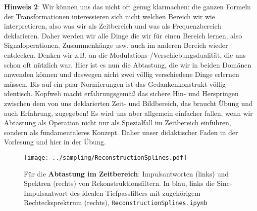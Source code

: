 \textbf{Hinweis 2}: Wir können uns das nicht oft genug klarmachen: die ganzen
Formeln der Transformationen interessieren sich nicht welchen Bereich wir wie
interpretieren,
also was wir als Zeitbereich und was als Frequenzbereich deklarieren. Daher werden
wir alle Dinge die wir für einen Bereich lernen, also Signaloperationen, Zusammenhänge usw.
auch im anderen Bereich wieder entdecken. Denken wir z.B.
an die Modulations-/Verschiebungsdualität,
die uns schon oft nützlich war.
Hier ist es nun die Abtastung, die wir in beiden Domänen anwenden können und
deswegen nicht zwei völlig verschiedene Dinge erlernen müssen. Bis auf ein
paar Normierungen ist das Gedankenkonstrukt völlig identisch. Kopfweh macht
erfahrungsgemäß das sichere Hin- und Herspringen zwischen dem von uns deklarierten
Zeit- und Bildbereich,
das braucht Übung und auch Erfahrung, zugegeben! Es wird uns aber allgemein
einfacher fallen, wenn wir Abtastung als Operation
nicht nur als Spezialfall im Zeitbereich einführen, sondern als fundamentaleres
Konzept. Daher unser didaktischer Faden in der Vorlesung und hier in der
Übung.



\begin{figure}
\texttt{[image: ../sampling/ReconstructionSplines.pdf]}
  \caption{Für die \textbf{Abtastung im Zeitbereich}: Impulsantworten (links) und
  Spektren (rechts) von
  Rekonstruktionsfiltern. In blau, links die Sinc-Impulsantwort des idealen
  Tiefpassfilters mit zugehörigem Rechtecksprektrum (rechts),
  \texttt{ReconstructionSplines.ipynb}}
  \label{fig:ReconstructionSplines}
\end{figure}



\clearpage
